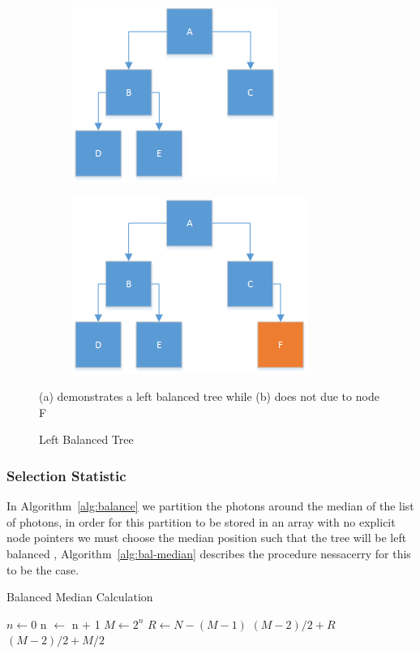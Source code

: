\begin{figure}
\centering
\begin{subfigure}{0.4\textwidth}
\includegraphics[scale=0.8]{./images/left-balanced-tree.png}
\caption{}
\end{subfigure}
\begin{subfigure}{0.4\textwidth}
\includegraphics[scale=0.8]{./images/non-left-balanced-tree.png}
\caption{}
\end{subfigure}
\caption{Left Balanced Tree}{(a) demonstrates a left balanced tree while (b) does not due to node F}
\end{figure}

\subsubsection{Selection Statistic}
In Algorithm~\ref{alg:balance} we partition the photons around the median of the list of photons, in order for
this partition to be stored in an array with no explicit node pointers we must choose the median position such
that the tree will be left balanced \cite{baerentzen03}, Algorithm~\ref{alg:bal-median} describes the procedure nessacerry for this
to be the case.

\begin{algorithm}
\caption{Balanced Median Calculation}
\label{alg:bal-median}
\begin{algorithmic}
\State $n \gets 0$
	\State n $\gets$ n + 1
\EndWhile
\State $M \gets 2^n$
\State $R \gets N - (M - 1)$
	\State \Return $(M - 2) / 2 + R$
\Else
	\State \Return $(M - 2) / 2 + M / 2$
\EndIf
\end{algorithmic}
\end{algorithm}

